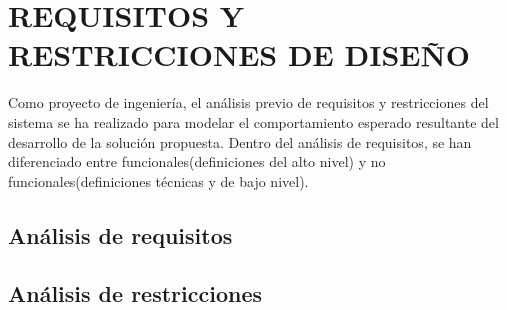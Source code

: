 \section{REQUISITOS Y RESTRICCIONES DE DISEÑO}

Como proyecto de ingeniería, el análisis previo de requisitos y restricciones del sistema se ha realizado para modelar el comportamiento esperado 
resultante del desarrollo de la solución propuesta. \newline
Dentro del análisis de requisitos, se han diferenciado entre funcionales(definiciones del alto nivel) y no funcionales(definiciones técnicas y de bajo nivel).

\subsection{Análisis de requisitos}

\clearpage

\subsection{Análisis de restricciones}